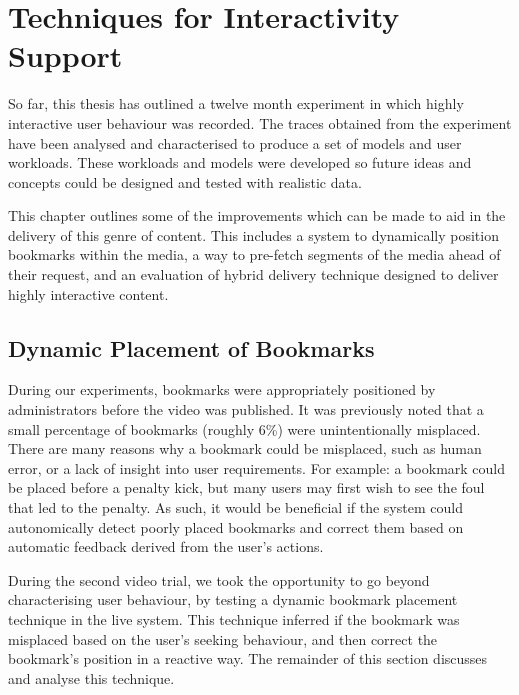 \chapter{Techniques for Interactivity Support}
\label{chap:new_techiques}



So far, this thesis has outlined a twelve month experiment in which highly interactive user behaviour was recorded. The traces obtained from the experiment have been analysed and characterised to produce a set of models and user workloads. These workloads and models were developed so future ideas and concepts could be designed and tested with realistic data.

This chapter outlines some of the improvements which can be made to aid in the delivery of this genre of content. This includes a system to dynamically position bookmarks within the media, a way to pre-fetch segments of the media ahead of their request, and an evaluation of hybrid delivery technique designed to deliver highly interactive content.

\section{Dynamic Placement of Bookmarks}
\label{sect:moving_bookmark}

During our experiments, bookmarks were appropriately positioned by administrators before the video was published. It was previously noted that a small percentage of bookmarks (roughly 6\%) were unintentionally misplaced. There are many reasons why a bookmark could be misplaced, such as human error, or a lack of insight into user requirements. For example: a bookmark could be placed before a penalty kick, but many users may first wish to see the foul that led to the penalty. As such, it would be beneficial if the system could autonomically detect poorly placed bookmarks and correct them based on automatic feedback derived from the user's actions.

During the second video trial, we took the opportunity to go beyond characterising user behaviour, by testing a dynamic bookmark placement technique in the live system. This technique inferred if the bookmark was misplaced based on the user's seeking behaviour, and then correct the bookmark's position in a reactive way. The remainder of this section discusses and analyse this technique.

